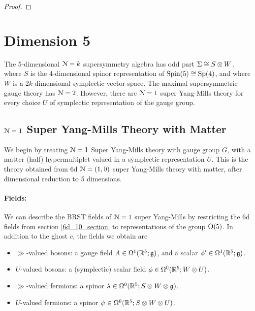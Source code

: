 \documentclass[10pt, oneside]{article}
\begin{document}
\begin{proof}
 
\end{proof}

\section{Dimension 5}
The 5-dimensional $\mathcal{N}=k$ supersymmetry algebra has odd part $\Sigma \cong S \otimes W$, where $S$ is the 4-dimensional spinor representation of $\mathrm{Spin}(5) \cong \mathrm{Sp}(4)$, and where $W$ is a $2k$-dimensional symplectic vector space.  The maximal supersymmetric gauge theory has $\mathcal{N}=2$.  However, there are $\mathcal{N}=1$ super Yang-Mills theory for every choice $U$ of symplectic representation of the gauge group.

\subsection{$\mathcal{N} = 1$ Super Yang-Mills Theory with Matter}
We begin by treating $\mathcal{N}=1$ Super Yang-Mills theory with gauge group $G$, with a matter (half) hypermultiplet valued in a symplectic representation $U$.  This is the theory obtained from 6d $\mathcal{N}=(1,0)$ super Yang-Mills theory with matter, after dimensional reduction to 5 dimensions.

\vspace{-10pt}
\paragraph{Fields:} We can describe the BRST fields of $\mathcal{N}=1$ super Yang-Mills by restricting the 6d fields from section \ref{6d_10_section} to representations of the group $\mathrm{O}(5)$.  In addition to the ghost $c$, the fields we obtain are
\begin{itemize}
 \item $\gg$-valued bosons: a gauge field $A \in \Omega^1(\mathbb R^5; \mathfrak{g})$, and a scalar $\phi' \in \Omega^1(\mathbb R^5; \mathfrak{g})$.
 \item $U$-valued bosons: a (symplectic) scalar field $\phi \in \Omega^0(\mathbb R^5; W \otimes U)$.
 \item $\gg$-valued fermions: a spinor $\lambda \in \Omega^0(\mathbb R^5; S \otimes W \otimes \mathfrak{g})$.
 \item $U$-valued fermions: a spinor $\psi \in \Omega^0(\mathbb R^5; S \otimes W \otimes U)$.
\end{itemize}

\vspace{-10pt}
\end{document}
